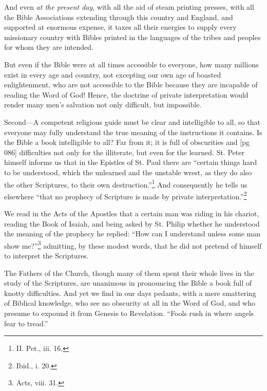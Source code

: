 And even \emph{at the present day}, with all the aid of
steam printing presses, with all the Bible Associations
extending through this country and England,
and supported at enormous expense, it taxes
all their energies to supply every missionary country
with Bibles printed in the languages of the
tribes and peoples for whom they are intended.

But even if the Bible were at all times accessible
to everyone, how many millions exist in every
age and country, not excepting our own age of
boasted enlightenment, who are not accessible to
the Bible because they are incapable of reading
the Word of God! Hence, the doctrine of private
interpretation would render many men's salvation
not only difficult, but impossible.

Second—A competent religious guide must be
clear and intelligible to all, so that everyone may
fully understand the true meaning of the instructions
it contains. Is the Bible a book intelligible
to all? Far from it; it is full of obscurities and
[pg 086]
difficulties not only for the illiterate, but even for
the learned. St. Peter himself informs us that
in the Epistles of St. Paul there are “certain
things hard to be understood, which the unlearned
and the unstable wrest, as they do also the other
Scriptures, to their own destruction.”\footnote{II.
Pet., iii. 16.} And
consequently he tells us elsewhere “that no
prophecy of Scripture is made by private interpretation.”\footnote{Ibid.,
i. 20.}

We read in the Acts of the Apostles that a certain
man was riding in his chariot, reading the
Book of Isaiah, and being asked by St. Philip
whether he understood the meaning of the prophecy
he replied: “How can I understand unless
some man show me?”\footnote{Acts, viii.
31.} admitting, by these modest
words, that he did not pretend of himself to
interpret the Scriptures.

The Fathers of the Church, though many of
them spent their whole lives in the study of the
Scriptures, are unanimous in pronouncing the
Bible a book full of knotty difficulties. And yet
we find in our days pedants, with a mere smattering
of Biblical knowledge, who see no obscurity
at all in the Word of God, and who presume to
expound it from Genesis to Revelation. “Fools
rush in where angels fear to tread.”

